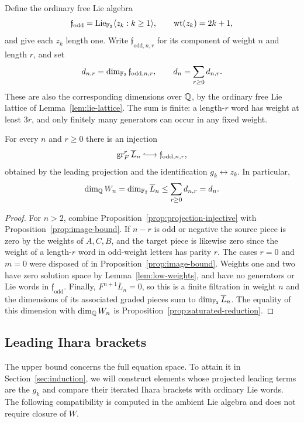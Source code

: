 Define the ordinary free Lie algebra
\[
 \mathfrak f_{\mathrm{odd}}
   =\operatorname{Lie}_{{\mathbb F_2}}\langle z_k:k\geq1\rangle,
 \qquad \operatorname{wt}(z_k)=2k+1,
\]
and give each $z_k$ length one.
Write $\mathfrak f_{\mathrm{odd},n,r}$ for its component of
weight $n$ and length $r$, and set
\begin{equation}
 \label{eq:free-dimensions}
 d_{n,r}=\dim_{{\mathbb F_2}}\mathfrak f_{\mathrm{odd},n,r},
 \qquad d_n=\sum_{r\geq0}d_{n,r}.
\end{equation}
These are also the corresponding dimensions over $\mathbb Q$, by
the ordinary free Lie lattice of Lemma~\ref{lem:lie-lattice}.
The sum is finite: a length-$r$ word has weight at least $3r$,
and only finitely many generators can occur in any fixed weight.

\begin{corollary}
\label{cor:dimension-bound}
For every $n$ and $r\geq0$ there is an injection
\[
 \operatorname{gr}^r_F\overline L_n
 \lhook\joinrel\longrightarrow
 \mathfrak f_{\mathrm{odd},n,r},
\]
obtained by the leading projection and the identification
$g_k\leftrightarrow z_k$.  In particular,
\begin{equation}
 \label{eq:dimension-upper-bound}
 \dim_{\mathbb Q}W_n
 =\dim_{{\mathbb F_2}}\overline L_n
 \leq\sum_{r\geq0}d_{n,r}=d_n.
\end{equation}
\end{corollary}

\begin{proof}
For $n>2$, combine Proposition~\ref{prop:projection-injective}
with Proposition~\ref{prop:image-bound}.
If $n-r$ is odd or negative the source piece is zero by the
weights of $A,C,B$, and the target piece is likewise zero since
the weight of a length-$r$ word in odd-weight letters has parity
$r$.  The cases $r=0$ and $m=0$ were disposed of in
Proposition~\ref{prop:image-bound}.
Weights one and two have zero solution space by
Lemma~\ref{lem:low-weights}, and have no generators or Lie words
in $\mathfrak f_{\mathrm{odd}}$.
Finally, $F^{n+1}\overline L_n=0$, so this is a finite filtration
in weight $n$ and the dimensions of its associated graded pieces
sum to $\dim_{{\mathbb F_2}}\overline L_n$.
The equality of this dimension with $\dim_{\mathbb Q}W_n$ is
Proposition~\ref{prop:saturated-reduction}.
\end{proof}

\subsection{Leading Ihara brackets}
The upper bound concerns the full equation space.  To attain it in
Section~\ref{sec:induction}, we will construct elements whose projected
leading terms are the $g_k$ and compare their iterated Ihara brackets
with ordinary Lie words.  The following compatibility is computed in
the ambient Lie algebra and does not require closure of $W$.

